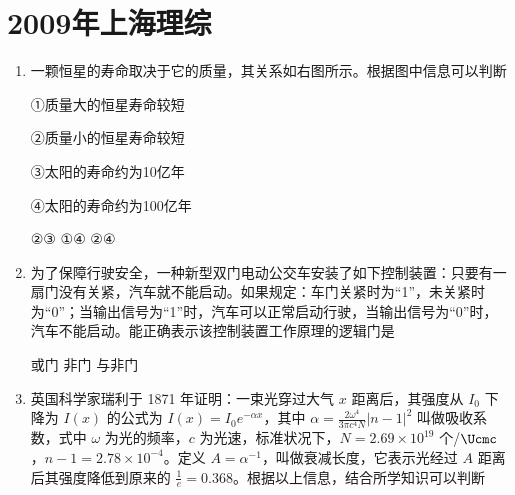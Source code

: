 \documentclass[\gkver]{gaokaozhenti}
\begin{document}
\chapter{2009年上海理综}

\begin{enumerate}
\item
一颗恒星的寿命取决于它的质量，其关系如右图所示。根据图中信息可以判断

①质量大的恒星寿命较短

②质量小的恒星寿命较短

③太阳的寿命约为10亿年

④太阳的寿命约为100亿年


{②③}
{①④}
{②④}


\item
为了保障行驶安全，一种新型双门电动公交车安装了如下控制装置：只要有一扇门没有关紧，汽车就不能启动。如果规定：车门关紧时为“1”，未关紧时为“0”；当输出信号为“1”时，汽车可以正常启动行驶，当输出信号为“0”时，汽车不能启动。能正确表示该控制装置工作原理的逻辑门是

{或门}
{非门}
{与非门}


\item
英国科学家瑞利于 1871 年证明：一束光穿过大气 $x$ 距离后，其强度从 $I_{0}$ 下降为 $I(x)$ 的公式为 $I(x)=I_{0}e^{-\alpha x}$，其中 $\alpha=\frac{2\omega^{4}}{3\pi c^{4}N}|n-1|^{2}$ 叫做吸收系数，式中 $\omega$ 为光的频率，$c$ 为光速，标准状况下，$N=2.69\times10^{19}$ 个/$\Ucmc$，$n-1=2.78\times10^{-4}$。定义 $A=\alpha^{-1}$，叫做衰减长度，它表示光经过 $A$ 距离后其强度降低到原来的 $\frac{1}{e}=0.368$。根据以上信息，结合所学知识可以判断


\end{enumerate}
\end{document}
